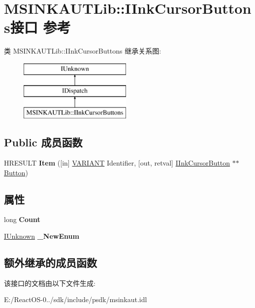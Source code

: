 \hypertarget{interface_m_s_i_n_k_a_u_t_lib_1_1_i_ink_cursor_buttons}{}\section{M\+S\+I\+N\+K\+A\+U\+T\+Lib\+:\+:I\+Ink\+Cursor\+Buttons接口 参考}
\label{interface_m_s_i_n_k_a_u_t_lib_1_1_i_ink_cursor_buttons}
类 M\+S\+I\+N\+K\+A\+U\+T\+Lib\+:\+:I\+Ink\+Cursor\+Buttons 继承关系图\+:\begin{figure}[H]
\begin{center}
\leavevmode
\includegraphics[height=3.000000cm]{interface_m_s_i_n_k_a_u_t_lib_1_1_i_ink_cursor_buttons}
\end{center}
\end{figure}
\subsection*{Public 成员函数}
\begin{DoxyCompactItemize}
\item 
\mbox{\label{interface_m_s_i_n_k_a_u_t_lib_1_1_i_ink_cursor_buttons_ae908c8e944c9899c50c42442b7506e8a}} 
H\+R\+E\+S\+U\+LT {\bfseries Item} (\mbox{[}in\mbox{]} \hyperlink{structtag_v_a_r_i_a_n_t}{V\+A\+R\+I\+A\+NT} Identifier, \mbox{[}out, retval\mbox{]} \hyperlink{interface_m_s_i_n_k_a_u_t_lib_1_1_i_ink_cursor_button}{I\+Ink\+Cursor\+Button} $\ast$$\ast$\hyperlink{struct_button}{Button})
\end{DoxyCompactItemize}
\subsection*{属性}
\begin{DoxyCompactItemize}
\item 
\mbox{\label{interface_m_s_i_n_k_a_u_t_lib_1_1_i_ink_cursor_buttons_ac685af10bfcfbb451a3bd039e2b697a1}} 
long {\bfseries Count}
\item 
\mbox{\label{interface_m_s_i_n_k_a_u_t_lib_1_1_i_ink_cursor_buttons_a26eb2e6e631d345f328475924058c023}} 
\hyperlink{interface_i_unknown}{I\+Unknown} {\bfseries \+\_\+\+New\+Enum}
\end{DoxyCompactItemize}
\subsection*{额外继承的成员函数}


该接口的文档由以下文件生成\+:\begin{DoxyCompactItemize}
\item 
E\+:/\+React\+O\+S-\/0../sdk/include/psdk/msinkaut.\+idl\end{DoxyCompactItemize}

